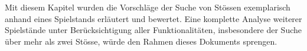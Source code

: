 Mit diesem Kapitel wurden die Vorschläge der Suche von Stössen exemplarisch anhand eines Spielstands erläutert und bewertet.
Eine komplette Analyse weiterer Spielstände unter Berücksichtigung aller Funktionalitäten,
insbesondere der Suche über mehr als zwei Stösse, würde den Rahmen dieses Dokuments sprengen.


